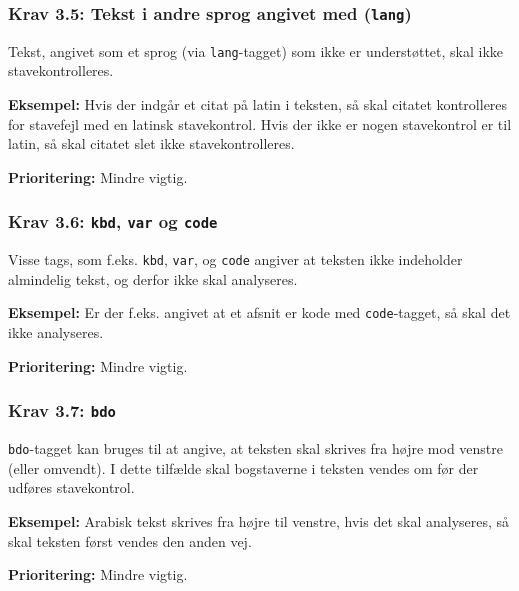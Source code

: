 \documentclass[a4paper,oneside,article, titlepage]{article}
\begin{document}
\subsubsection{Krav 3.5: Tekst i andre sprog angivet med
  (\texttt{lang})}
Tekst, angivet som et sprog (via \texttt{lang}-tagget) som ikke er
understøttet, skal ikke stavekontrolleres.

\begin{description}
\item \textbf{Eksempel:} Hvis der indgår et citat på latin i teksten,
  så skal citatet kontrolleres for stavefejl med en latinsk
  stavekontrol. Hvis der ikke er nogen stavekontrol er til latin, så
  skal citatet slet ikke stavekontrolleres.
\item \textbf{Prioritering:} Mindre vigtig.
\end{description}

\subsubsection{Krav 3.6: \texttt{kbd}, \texttt{var} og \texttt{code}}
Visse tags, som f.eks. \texttt{kbd}, \texttt{var}, og \texttt{code}
angiver at teksten ikke indeholder almindelig tekst, og derfor ikke
skal analyseres.

\begin{description}
\item \textbf{Eksempel:} Er der f.eks. angivet at et afsnit er kode
  med \texttt{code}-tagget, så skal det ikke analyseres.
\item \textbf{Prioritering:} Mindre vigtig.
\end{description}

\subsubsection{Krav 3.7: \texttt{bdo}}
\texttt{bdo}-tagget kan bruges til at angive, at teksten skal skrives
fra højre mod venstre (eller omvendt). I dette tilfælde skal
bogstaverne i teksten vendes om før der udføres stavekontrol.

\begin{description}
\item \textbf{Eksempel:} Arabisk tekst skrives fra højre til venstre,
  hvis det skal analyseres, så skal teksten først vendes den
  anden vej.
\item \textbf{Prioritering:} Mindre vigtig.
\end{description}
\end{document}
